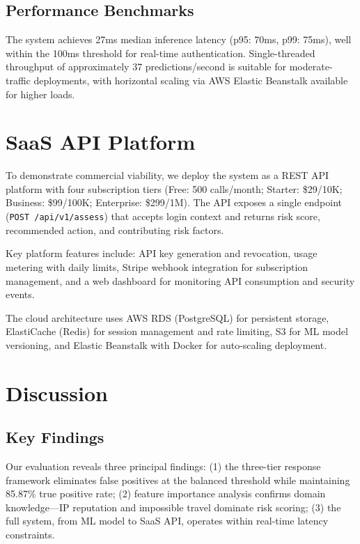 \documentclass[conference]{IEEEtran}
\begin{document}
\subsection{Performance Benchmarks}

The system achieves 27ms median inference latency (p95: 70ms, p99: 75ms), well within the 100ms threshold for real-time authentication. Single-threaded throughput of approximately 37 predictions/second is suitable for moderate-traffic deployments, with horizontal scaling via AWS Elastic Beanstalk available for higher loads.

\section{SaaS API Platform}

To demonstrate commercial viability, we deploy the system as a REST API platform with four subscription tiers (Free: 500 calls/month; Starter: \$29/10K; Business: \$99/100K; Enterprise: \$299/1M). The API exposes a single endpoint (\texttt{POST /api/v1/assess}) that accepts login context and returns risk score, recommended action, and contributing risk factors.

Key platform features include: API key generation and revocation, usage metering with daily limits, Stripe webhook integration for subscription management, and a web dashboard for monitoring API consumption and security events.

The cloud architecture uses AWS RDS (PostgreSQL) for persistent storage, ElastiCache (Redis) for session management and rate limiting, S3 for ML model versioning, and Elastic Beanstalk with Docker for auto-scaling deployment.

\section{Discussion}

\subsection{Key Findings}

Our evaluation reveals three principal findings: (1) the three-tier response framework eliminates false positives at the balanced threshold while maintaining 85.87\% true positive rate; (2) feature importance analysis confirms domain knowledge---IP reputation and impossible travel dominate risk scoring; (3) the full system, from ML model to SaaS API, operates within real-time latency constraints.
\end{document}
